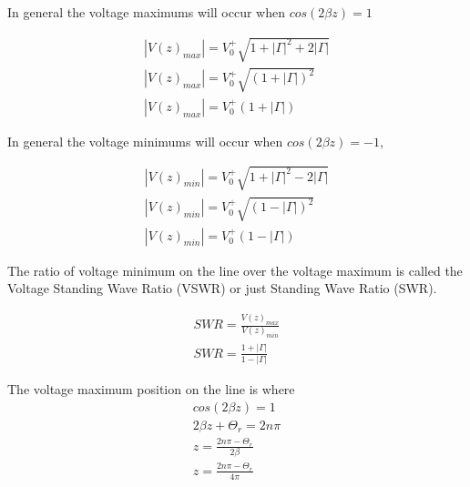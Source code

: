 \documentclass{ximera}
\begin{document}
\begin{itemize}
In general the voltage maximums will occur when
$cos(2 \beta z)=1$

\begin{eqnarray}
|V(z)_{max}|=V_0^+\sqrt{1+|\Gamma|^2+2 |\Gamma|} \nonumber  \\
|V(z)_{max}| =V_0^+\sqrt{(1+|\Gamma|)^2}  \nonumber \\
|V(z)_{max}| =V_0^+(1+|\Gamma|) 
\end{eqnarray}



In general the voltage minimums will occur when
$cos(2 \beta z)=-1$,



\begin{eqnarray}
|V(z)_{min}|=V_0^+\sqrt{1+|\Gamma|^2-2 |\Gamma|} \nonumber  \\
|V(z)_{min}| =V_0^+\sqrt{(1-|\Gamma|)^2}  \nonumber \\
|V(z)_{min}| =V_0^+ (1-|\Gamma|) 
\end{eqnarray}

The ratio of voltage minimum on the line over the voltage maximum is
called the Voltage Standing Wave Ratio (VSWR) or just Standing Wave
Ratio (SWR).

\begin{eqnarray}
SWR=\frac{V(z)_{max}}{ V(z)_{min}} \nonumber \\
SWR=\frac{1+|\Gamma|}{1-|\Gamma|}
\end{eqnarray}

The voltage maximum position on the line is where
\begin{eqnarray}
cos(2 \beta z)=1 \nonumber \\
2 \beta z + \Theta_r = 2 n \pi \nonumber \\
z =\frac{ 2 n \pi -\Theta_r }{ 2 \beta} \nonumber \\
z=\frac{ 2 n \pi -\Theta_r }{ 4 \pi}
\end{eqnarray}



\end{itemize}
\end{document}
